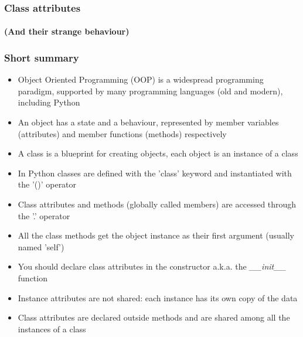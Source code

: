 \documentclass[9pt]{beamer}
\begin{document}
\begin{frame}
  \frametitle{Class attributes}
  \framesubtitle{(And their strange behaviour)}
  
\end{frame}


\begin{frame}
  \frametitle{Short summary}

  \begin{itemize}
    \footnotesize
    \item Object Oriented Programming (OOP) is a widespread programming paradigm,
          supported by many programming languages (old and modern), including Python
    \medskip
    \item An object has a state and a behaviour, represented by member variables (attributes)
          and member functions (methods) respectively
    \medskip
    \item A class is a blueprint for creating objects, each object is an instance of a class
    \medskip
    \item In Python classes are defined with the 'class' keyword and instantiated with the '()' operator
    \medskip
    \item Class attributes and methods (globally called members) are accessed through the '.' operator
    \medskip
    \item All the class methods get the object instance as their first argument (usually named 'self')
    \medskip
    \item You should declare class attributes in the constructor a.k.a. the \emph{\_\_init\_\_} function
    \medskip
    \item Instance attributes are not shared: each instance has its own copy of the data
    \medskip
    \item Class attributes are declared outside methods and are shared among all the instances of a class
  \end{itemize}

\end{frame}
\end{document}
